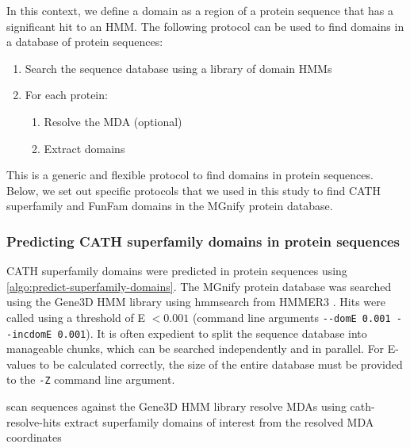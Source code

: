 In this context, we define a domain as a region of a protein sequence that has a significant hit to an HMM. The following protocol can be used to find domains in a database of protein sequences:

\begin{enumerate}
\def\labelenumi{\arabic{enumi}.}
\item Search the sequence database using a library of domain HMMs
\item For each protein:
  \begin{enumerate}
    \def\labelenumii{\roman{enumii}.}
    \item Resolve the MDA (optional)
    \item Extract domains
  \end{enumerate}
\end{enumerate}

This is a generic and flexible protocol to find domains in protein sequences. Below, we set out specific protocols that we used in this study to find CATH superfamily and FunFam domains in the MGnify protein database.

\subsubsection{Predicting CATH superfamily domains in protein sequences}
\label{sec:find_superfamily_domains}

CATH superfamily domains were predicted in protein sequences using \ref{algo:predict-superfamily-domains}. The MGnify protein database was searched using the Gene$3$D HMM library using hmmsearch from HMMER3 \cite{Mistry2013}. Hits were called using a threshold of E $< 0.001$ (command line arguments \texttt{-\/-domE\ 0.001\ -\/-incdomE\ 0.001}). It is often expedient to split the sequence database into manageable chunks, which can be searched independently and in parallel. For E-values to be calculated correctly, the size of the entire database must be provided to the \texttt{-Z} command line argument.

\begin{algorithm}[hbt!]
    \caption{%
        Predict CATH superfamily domains in protein sequences.
    }
    \label{algo:predict-superfamily-domains}
    \begin{algorithmic}[1]
        \Procedure{}{}
        \State scan sequences against the Gene$3$D HMM library
        \State resolve MDAs using cath-resolve-hits
        \State extract superfamily domains of interest from the resolved MDA coordinates
        \EndProcedure
    \end{algorithmic}
\end{algorithm}

